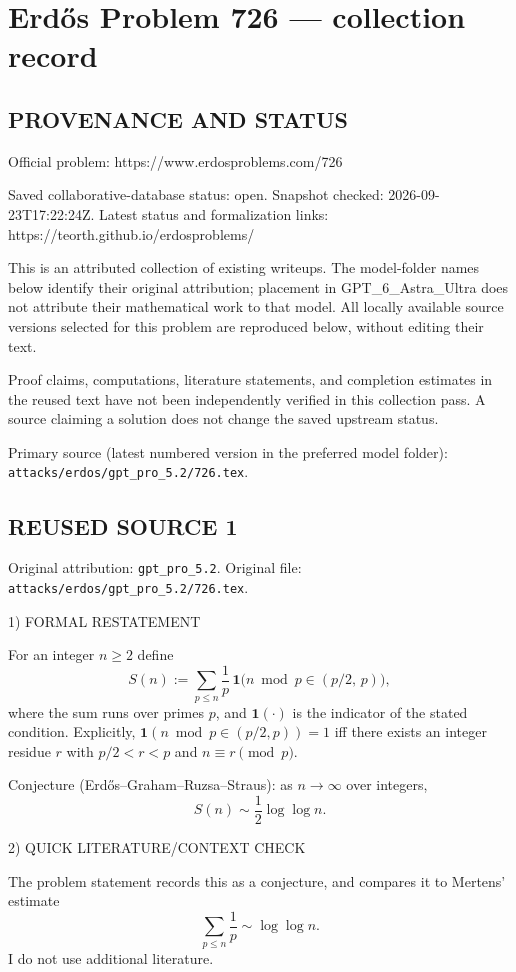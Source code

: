 \section*{Erd\H{o}s Problem 726 --- collection record}

\subsection*{PROVENANCE AND STATUS}
Official problem: https://www.erdosproblems.com/726

Saved collaborative-database status: open.
Snapshot checked: 2026-09-23T17:22:24Z.
Latest status and formalization links: https://teorth.github.io/erdosproblems/

This is an attributed collection of existing writeups. The model-folder names below identify their original attribution; placement in GPT\_6\_Astra\_Ultra does not attribute their mathematical work to that model. All locally available source versions selected for this problem are reproduced below, without editing their text.

Proof claims, computations, literature statements, and completion estimates in the reused text have not been independently verified in this collection pass. A source claiming a solution does not change the saved upstream status.

Primary source (latest numbered version in the preferred model folder): \texttt{attacks/erdos/gpt\_pro\_5.2/726.tex}.

\subsection*{REUSED SOURCE 1}
Original attribution: \texttt{gpt\_pro\_5.2}.
Original file: \texttt{attacks/erdos/gpt\_pro\_5.2/726.tex}.


1) FORMAL RESTATEMENT

For an integer $n\ge 2$ define
\[
S(n) := \sum_{p\le n} \frac{1}{p}\,\mathbf 1\big( n\bmod p \in (p/2,\,p)\big),
\]
where the sum runs over primes $p$, and $\mathbf 1(\cdot)$ is the indicator of the stated condition.
Explicitly, $\mathbf 1(n\bmod p\in(p/2,p))=1$ iff there exists an integer residue $r$ with $p/2<r<p$ and $n\equiv r\pmod p$.

Conjecture (Erd\H{o}s--Graham--Ruzsa--Straus): as $n\to\infty$ over integers,
\[
S(n) \sim \frac{1}{2}\log\log n.
\]

2) QUICK LITERATURE/CONTEXT CHECK

The problem statement records this as a conjecture, and compares it to Mertens' estimate
\[
\sum_{p\le n}\frac{1}{p}\sim \log\log n.
\]
I do not use additional literature.

